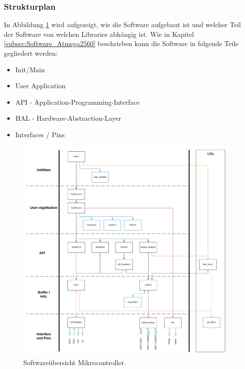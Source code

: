 
\subsubsection{Strukturplan}
\label{subsubsec:Strukturplan_Atmega}

In Abbildung \ref{fig:Softwareuebersicht_Atmega2560} wird aufgezeigt, wie die Software aufgebaut ist und welcher Teil der Software von welchen Libraries abhängig ist. Wie in Kapitel \ref{subsec:Software_Atmega2560} beschrieben kann die Software in folgende Teile gegliedert werden:
\begin{itemize}
\item Init/Main
\item User Application
\item API - Application-Programming-Interface
\item HAL - Hardware-Abstraction-Layer
\item Interfaces / Pins
\end{itemize}

\begin{figure}[h!]
	\centering
	\includegraphics[width=\textwidth]{graphics/Softwareuebersicht.pdf}
	\caption{Softwareübersicht Mikrocontroller.}
	\label{fig:Softwareuebersicht_Atmega2560}
\end{figure}

